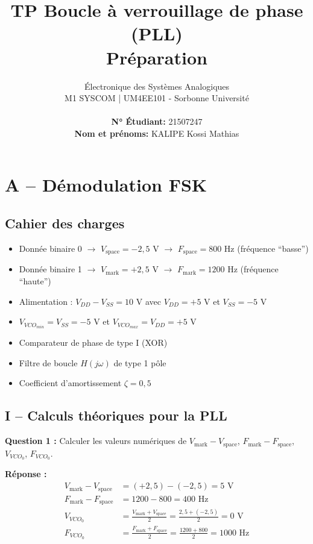 \documentclass[a4paper,11pt]{article}
\title{\textbf{TP Boucle à verrouillage de phase (PLL)} \\ \Large Préparation}
\author{Électronique des Systèmes Analogiques\\M1 SYSCOM | UM4EE101 - Sorbonne Université \\ \\ \textbf{N° Étudiant:} 21507247 \\ \textbf{Nom et prénoms:} KALIPE Kossi Mathias}
\date{}
\begin{document}

\maketitle

\section*{A -- Démodulation FSK}

\subsection*{Cahier des charges}
\begin{itemize}
    \item Donnée binaire 0 $\rightarrow$ $V_{\text{space}} = -2{,}5$ V $\rightarrow$ $F_{\text{space}} = 800$ Hz (fréquence ``basse'')
    \item Donnée binaire 1 $\rightarrow$ $V_{\text{mark}} = +2{,}5$ V $\rightarrow$ $F_{\text{mark}} = 1200$ Hz (fréquence ``haute'')
    \item Alimentation : $V_{DD} - V_{SS} = 10$ V avec $V_{DD} = +5$ V et $V_{SS} = -5$ V
    \item $V_{VCO_{min}} = V_{SS} = -5$ V et $V_{VCO_{max}} = V_{DD} = +5$ V
    \item Comparateur de phase de type I (XOR)
    \item Filtre de boucle $H(j\omega)$ de type 1 pôle
    \item Coefficient d'amortissement $\zeta = 0{,}5$
\end{itemize}

\subsection*{I -- Calculs théoriques pour la PLL}

\textbf{Question 1 :} Calculer les valeurs numériques de $V_{\text{mark}} - V_{\text{space}}$, $F_{\text{mark}} - F_{\text{space}}$, $V_{VCO_0}$, $F_{VCO_0}$.

\vspace{0.3cm}
\textbf{Réponse :}
\begin{align*}
V_{\text{mark}} - V_{\text{space}} &= (+2{,}5) - (-2{,}5) = \boxed{5 \text{ V}} \\
F_{\text{mark}} - F_{\text{space}} &= 1200 - 800 = \boxed{400 \text{ Hz}} \\
V_{VCO_0} &= \frac{V_{\text{mark}} + V_{\text{space}}}{2} = \frac{2{,}5 + (-2{,}5)}{2} = \boxed{0 \text{ V}} \\
F_{VCO_0} &= \frac{F_{\text{mark}} + F_{\text{space}}}{2} = \frac{1200 + 800}{2} = \boxed{1000 \text{ Hz}}
\end{align*}
\end{document}
